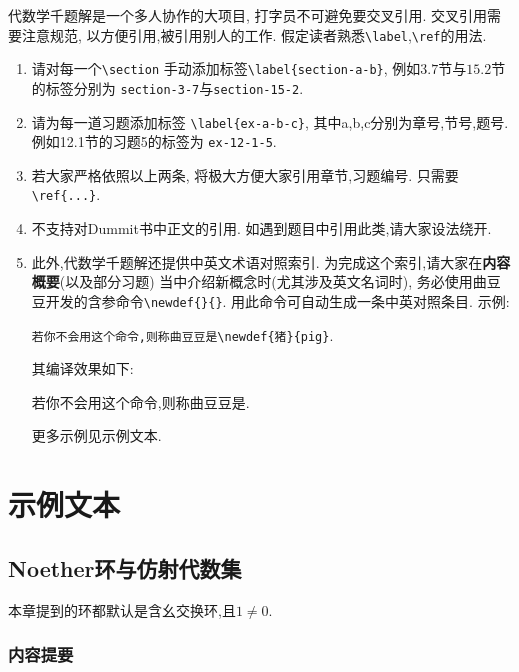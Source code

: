 \documentclass[oneside,a4papar,11pt,UTF8]{book}
\begin{document}
代数学千题解是一个多人协作的大项目,
打字员不可避免要交叉引用.
交叉引用需要注意规范,
以方便引用,被引用别人的工作.
假定读者熟悉\verb"\label",\verb"\ref"的用法.

\begin{enumerate}
  \item 请对每一个\verb"\section"
  手动添加标签\verb"\label{section-a-b}",
  例如$3.7$节与$15.2$节的标签分别为
  \verb"section-3-7"与\verb"section-15-2".
  
  \item 请为每一道习题添加标签
  \verb"\label{ex-a-b-c}",
  其中a,b,c分别为章号,节号,题号.
  例如12.1节的习题5的标签为 \verb"ex-12-1-5".
  
  \item 若大家严格依照以上两条,
  将极大方便大家引用章节,习题编号.
  只需要\verb"\ref{...}".
  
  \item 不支持对Dummit书中正文的引用.
  如遇到题目中引用此类,请大家设法绕开.
  
  \item 此外,代数学千题解还提供中英文术语对照索引.
  为完成这个索引,请大家在\textbf{内容概要}(以及部分习题)
  当中介绍新概念时(尤其涉及英文名词时),
  务必使用曲豆豆开发的含参命令\verb"\newdef{}{}".
  用此命令可自动生成一条中英对照条目.
  示例:
  \begin{center}
    \verb"若你不会用这个命令,则称曲豆豆是\newdef{猪}{pig}".
  \end{center}
  其编译效果如下:
  \begin{center}
    若你不会用这个命令,则称曲豆豆是.
  \end{center}
  更多示例见示例文本.
\end{enumerate}




\chapter{示例文本}

\section{Noether环与仿射代数集}
\label{section-15-1}

本章提到的环都默认是含幺交换环,且$1\neq 0$.

\subsection{内容提要}
\end{document}
